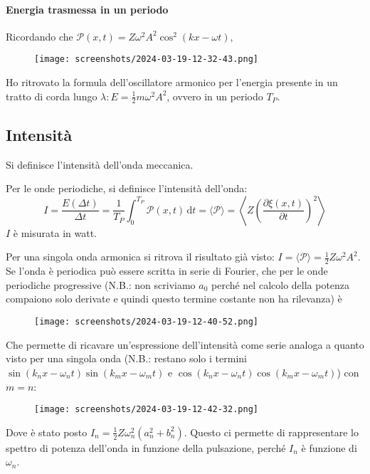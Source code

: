 \paragraph{Energia trasmessa in un periodo}
Ricordando che \(\mathcal{P} (x,t) = Z \omega ^{2} A ^{2} \cos ^{2} (kx-\omega t)\),
\begin{figure}[H]
	\centering
	\texttt{[image: screenshots/2024-03-19-12-32-43.png]}
\end{figure}
Ho ritrovato la formula dell'oscillatore armonico per l'energia presente in un tratto di corda lungo \(\lambda: E = \frac{1}{2}m \omega ^{2} A^{2}  \), ovvero in un periodo \(T_P\).

\subsection{Intensità}

Si definisce l'intensità dell'onda meccanica.

\begin{definition}
	[Intensità]\label{def:intensita}
	Per le onde periodiche, si definisce l'intensità dell'onda:
	\[
		I = \frac{E(\Delta t)}{\Delta t} = \frac{1}{T_P}\int_{0}^{T_P} \mathcal{P} (x,t) \,\mathrm{d}t = \langle \mathcal{P}  \rangle = \left\langle Z \left( \frac{\partial \xi (x,t)}{\partial t} \right)^{2}   \right\rangle 
	\]
	\(I\) è misurata in watt.
\end{definition}

Per una singola onda armonica si ritrova il risultato già visto: \(I = \langle \mathcal{P}  \rangle = \frac{1}{2}Z \omega ^{2} A ^{2} \). Se l'onda è periodica può essere scritta in serie di Fourier, che per le onde periodiche progressive (N.B.: non scriviamo \(a_0\) perché nel calcolo della potenza compaiono solo derivate e quindi questo termine costante non ha rilevanza) è
\begin{figure}[H]
	\centering
	\texttt{[image: screenshots/2024-03-19-12-40-52.png]}
\end{figure}
Che permette di ricavare un'espressione dell'intensità come serie analoga a quanto visto per una singola onda (N.B.: restano solo i termini \(\sin (k_n x- \omega _n t) \sin (k_m x- \omega _m t)\) e \(\cos (k_n x- \omega _n t) \cos (k_m x- \omega _m t)\)) con \(m=n\):
\begin{figure}[H]
	\centering
	\texttt{[image: screenshots/2024-03-19-12-42-32.png]}
\end{figure}
Dove è stato posto \(I_n = \frac{1}{2} Z \omega ^{2} _n (a^{2} _n + b ^{2} _n )\). Questo ci permette di rappresentare lo spettro di potenza dell'onda in funzione della pulsazione, perché \(I_n\) è funzione di \(\omega _n\).

